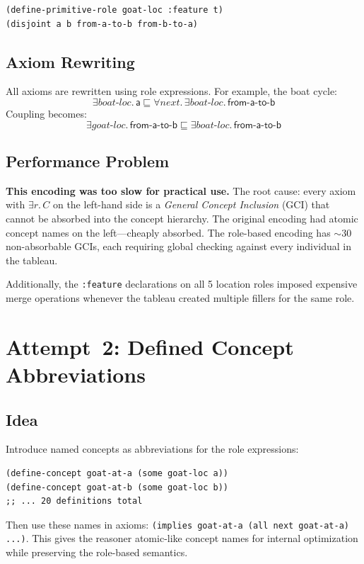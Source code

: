 \documentclass[11pt,a4paper]{article}
\newcommand{\DLsome}[2]{\exists #1.\,#2}
\newcommand{\DLall}[2]{\forall #1.\,#2}
\newcommand{\DLsub}{\sqsubseteq}
\newcommand{\concept}[1]{\ensuremath{\mathsf{#1}}}
\newcommand{\role}[1]{\ensuremath{\mathit{#1}}}
\begin{document}
\begin{lstlisting}[style=racer]
(define-primitive-role goat-loc :feature t)
(disjoint a b from-a-to-b from-b-to-a)
\end{lstlisting}

\subsection{Axiom Rewriting}

All axioms are rewritten using role expressions.  For example, the boat
cycle:
\[
\DLsome{\role{boat\text{-}loc}}{\concept{a}} \DLsub
  \DLall{\role{next}}{\DLsome{\role{boat\text{-}loc}}{\concept{from\text{-}a\text{-}to\text{-}b}}}
\]
Coupling becomes:
\[
\DLsome{\role{goat\text{-}loc}}{\concept{from\text{-}a\text{-}to\text{-}b}} \DLsub
  \DLsome{\role{boat\text{-}loc}}{\concept{from\text{-}a\text{-}to\text{-}b}}
\]

\subsection{Performance Problem}

\textbf{This encoding was too slow for practical use.}  The root cause:
every axiom with $\DLsome{\role{r}}{C}$ on the left-hand side is a
\emph{General Concept Inclusion} (GCI) that cannot be absorbed into the
concept hierarchy.  The original encoding had atomic concept names on the
left---cheaply absorbed.  The role-based encoding has ${\sim}30$
non-absorbable GCIs, each requiring global checking against every
individual in the tableau.

Additionally, the \texttt{:feature} declarations on all 5 location roles
imposed expensive merge operations whenever the tableau created multiple
fillers for the same role.

\section{Attempt~2: Defined Concept Abbreviations}
\label{sec:attempt2}

\subsection{Idea}

Introduce named concepts as abbreviations for the role expressions:
\begin{lstlisting}[style=racer]
(define-concept goat-at-a (some goat-loc a))
(define-concept goat-at-b (some goat-loc b))
;; ... 20 definitions total
\end{lstlisting}
Then use these names in axioms: \texttt{(implies goat-at-a (all next
goat-at-a) ...)}. This gives the reasoner atomic-like concept names for
internal optimization while preserving the role-based semantics.
\end{document}
